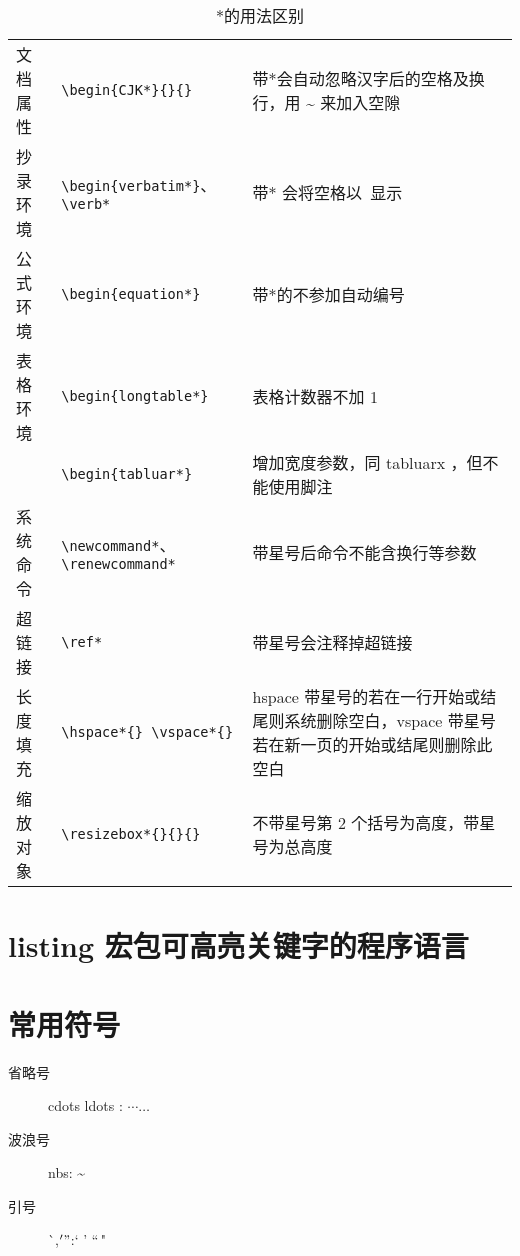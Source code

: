 \begin{table}[H]
  \centering
  \caption{$*$的用法区别}\label{star_use}
\begin{tabularx}{14cm}{lp{6cm}X}
  \toprule
  文档属性 & \verb|\begin{CJK*}{}{}| & 带$*$会自动忽略汉字后的空格及换行，用 \~{} 来加入空隙\\
抄录环境 & \verb|\begin{verbatim*}|、\verb|\verb*| &  带$*$ 会将空格以\verb*| |显示 \\
公式环境 & \verb|\begin{equation*}| & 带$*$的不参加自动编号 \\
表格环境 &\verb|\begin{longtable*}| & 表格计数器不加 1\\
&\verb|\begin{tabluar*}| & 增加宽度参数，同 tabluarx ，但不能使用脚注\\
系统命令 & \verb|\newcommand*|、\verb|\renewcommand*| & 带星号后命令不能含换行等参数\\
超链接 & \verb|\ref*| & 带星号会注释掉超链接\\
长度填充 & \verb|\hspace*{} \vspace*{}| & hspace 带星号的若在一行开始或结尾则系统删除空白，vspace 带星号若在新一页的开始或结尾则删除此空白\\
缩放对象 & \verb|\resizebox*{}{}{}| & 不带星号第 2 个括号为高度，带星号为总高度\\
  \bottomrule
\end{tabularx}
\end{table}



\section{listing 宏包可高亮关键字的程序语言}

\section{常用符号}
\begin{description}
  \item[省略号] cdots  ldots : $\cdots  \ldots$
  \item[波浪号] nbs: \~{}
  \item[引号] \`{},$'"$:` ' ``\,"
\end{description}

